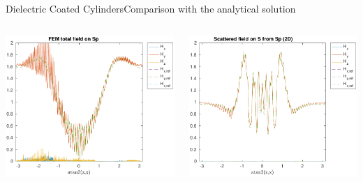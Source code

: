 \begin{frame}[allowframebreaks]{Dielectric Coated Cylinders}{Comparison with the analytical solution }
\begin{columns}
      \includegraphics[width=\linewidth]{results/TEc15/H_Sp.pdf}

      \includegraphics[width=\linewidth]{results/TEc15/H_S.pdf}
      
    \end{columns}
    




  \end{frame}

  
